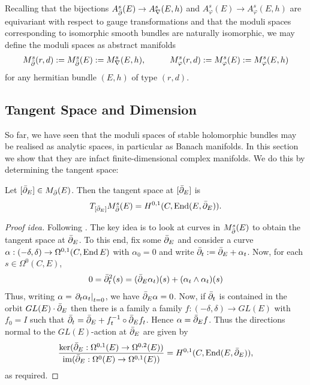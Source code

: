 \documentclass[12pt]{ociamthesis}  %
\begin{document}
Recalling that the bijections $A^s_{\bar{\partial}}(E)\to A^s_\nabla(E,h)$ and
$A^s_\varphi(E)\to A^s_\varphi(E,h)$ are equivariant with respect to gauge
transformations and that the moduli spaces corresponding
to isomorphic smooth bundles are naturally isomorphic, we may define
the moduli spaces as abstract manifolds
\begin{align}\label{eq:abstract_analytic_spaces}
  M^s_{\bar{\partial}}(r,d) := M^s_{\bar{\partial}}(E) := M^s_\nabla(E,h), \hspace{1cm}
  M^s_\varphi(r,d) := M^s_\varphi(E) := M^s_\varphi(E,h)
\end{align}
for any hermitian bundle $(E,h)$ of type $(r,d)$.

\subsection{Tangent Space and Dimension}

So far, we have seen that the moduli spaces of stable holomorphic
bundles may be realised as analytic spaces, in particular as
Banach manifolds. In this section we show that they are infact
finite-dimensional complex manifolds. We do this by determining
the tangent space:

\begin{theorem}
  Let $[{\bar{\partial}}_E]\in M_{\bar{\partial}}(E)$. Then the tangent space at $[{\bar{\partial}}_E]$ is
  \begin{align*}
    T_{[{\bar{\partial}}_E]}M^s_{\bar{\partial}}(E) = H^{0,1}(C,\operatorname{End}(E,{\bar{\partial}}_E)).
  \end{align*}
  \begin{proof}[Proof idea]
    Following \cite[223-225]{kobayashi1987}. The key idea is to look
    at curves in $M^s_{\bar{\partial}}(E)$ to obtain the tangent space at ${\bar{\partial}}_E$.
    To this end, fix some ${\bar{\partial}}_E$ and consider a curve 
    $\alpha : (-\delta,\delta) \to \Omega^{0,1}(C,\operatorname{End} E)$
    with $\alpha_0 = 0$ and write ${\bar{\partial}}_t := {\bar{\partial}}_E + \alpha_t$.
    Now, for each $s\in\Omega^0(C,E)$,
    \begin{align*}
      0 = {\bar{\partial}}_t^2(s) = ({\bar{\partial}}_E \alpha_t)(s) + (\alpha_t\wedge\alpha_t)(s)
    \end{align*}
    Thus, writing $\alpha = \left.{\partial_t\alpha_t}\right\vert_{t=0}$,
    we have ${\bar{\partial}}_E \alpha = 0$. Now, if ${\bar{\partial}}_t$ is contained in
    the orbit $GL(E)\cdot{\bar{\partial}}_E$ then there is a family
    a family $f : (-\delta,\delta) \to GL(E)$ with $f_0 = I$
    such that ${\bar{\partial}}_t = {\bar{\partial}}_E + f^{-1}_t \circ {\bar{\partial}}_E f_t$.
    Hence $\alpha = {\bar{\partial}}_E f$.  Thus the directions normal to
    the $GL(E)$-action at ${\bar{\partial}}_E$ are given by
    \begin{align*}
      \frac{\ker({\bar{\partial}}_E : \Omega^{0,1}(E) \to \Omega^{0,2}(E))}{\operatorname{im}({\bar{\partial}}_E : \Omega^0(E)\to\Omega^{0,1}(E))}
      = H^{0,1}(C,\operatorname{End}(E,{\bar{\partial}}_E)),
    \end{align*}
    as required.
  \end{proof}
\end{theorem}
\end{document}
